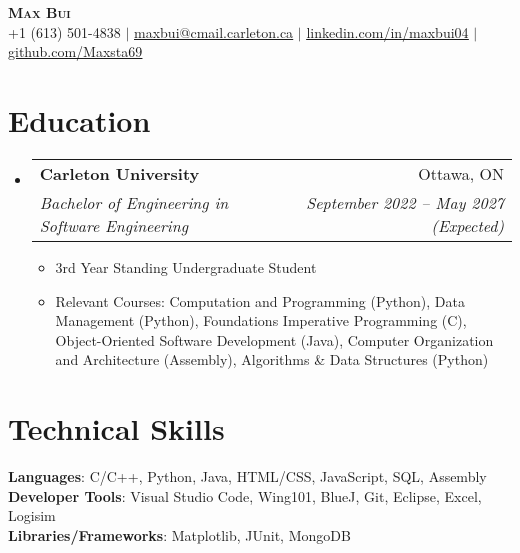 \documentclass[letterpaper,11pt]{article}
\makeatletter
\newcommand{\resumeItem}[1]{
  \item\small{
    {#1 \vspace{-2pt}}
  }
}
\newcommand{\resumeSubheading}[4]{
  \vspace{-2pt}\item
    \begin{tabular*}{0.97\textwidth}[t]{l@{\extracolsep{\fill}}r}
      \textbf{#1} & #2 \\
      \textit{\small#3} & \textit{\small #4} \\
    \end{tabular*}\vspace{-7pt}
}
\newcommand{\resumeSubHeadingListStart}{\begin{itemize}[leftmargin=0.15in, label={}]}
\newcommand{\resumeSubHeadingListEnd}{\end{itemize}}
\newcommand{\resumeItemListStart}{\begin{itemize}}
\newcommand{\resumeItemListEnd}{\end{itemize}\vspace{-5pt}}
\makeatother
\begin{document}

\begin{center}
    \textbf{\Huge \scshape Max Bui} \\ \vspace{1pt}
    \small +1 (613) 501-4838 $|$ \href{mailto:maxbui@cmail.carleton.ca}{\underline{maxbui@cmail.carleton.ca}} $|$ 
    \href{https://www.linkedin.com/in/maxbui04}{\underline{linkedin.com/in/maxbui04}} $|$
    \href{https://github.com/Maxsta69}{\underline{github.com/Maxsta69}}
\end{center}


\section{Education}
  \resumeSubHeadingListStart
    \resumeSubheading
      {Carleton University}{Ottawa, ON}
      {Bachelor of Engineering in Software Engineering}{September 2022 -- May 2027 (Expected)}
      \resumeItemListStart
        \resumeItem{3rd Year Standing Undergraduate Student}
        \resumeItem{Relevant Courses: Computation and Programming (Python), Data Management (Python), Foundations Imperative Programming (C), Object-Oriented Software Development (Java), Computer Organization and Architecture (Assembly), Algorithms \& Data Structures (Python)}
      \resumeItemListEnd
  \resumeSubHeadingListEnd


%
\section{Technical Skills}
 \begin{itemize}[leftmargin=0.15in, label={}]
    \small{\item{
     \textbf{Languages}{: C/C++, Python, Java, HTML/CSS, JavaScript, SQL, Assembly} \\
     \textbf{Developer Tools}{: Visual Studio Code, Wing101, BlueJ, Git, Eclipse, Excel, Logisim} \\
     \textbf{Libraries/Frameworks}{: Matplotlib, JUnit, MongoDB}
    }}
 \end{itemize}
\end{document}
